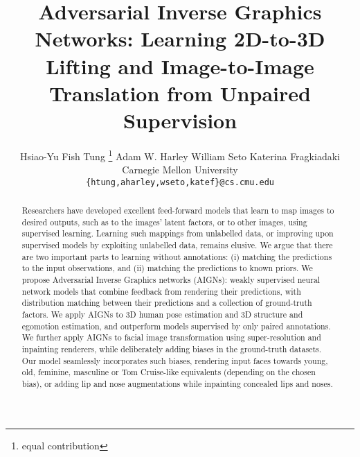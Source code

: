 \documentclass[10pt,twocolumn,letterpaper]{article}
\newcommand*\samethanks[1][\value{footnote}]{\footnotemark[#1]}
\begin{document}
\begin{bibunit}[ieee]
\title{Adversarial Inverse Graphics Networks: Learning 2D-to-3D Lifting and Image-to-Image Translation from Unpaired Supervision}

\author{Hsiao-Yu Fish Tung \thanks{equal contribution} 
\qquad
Adam W. Harley \samethanks[1] 
\qquad
William Seto \samethanks[1] 
\qquad
Katerina Fragkiadaki
\\
Carnegie Mellon University \\
{\tt\small \{htung,aharley,wseto,katef\}@cs.cmu.edu}
}

\maketitle


\begin{abstract}


Researchers have developed excellent feed-forward models that learn to map images to desired outputs, such as to the images' latent factors, or to other images, using supervised learning. Learning such mappings from unlabelled data, or improving upon supervised models by exploiting unlabelled data, remains elusive. We argue that there are two important parts to learning without annotations: 
(i) matching the predictions to the input observations, and (ii) matching the predictions to known priors.
We propose Adversarial Inverse Graphics networks (AIGNs): weakly supervised neural network models that combine feedback from rendering their predictions, with distribution matching between their predictions and a collection of ground-truth factors. We apply AIGNs to 3D human pose estimation and 3D structure and egomotion estimation, and outperform  models supervised by only paired annotations. We further apply AIGNs to facial image transformation using super-resolution and inpainting renderers, while deliberately adding biases in the ground-truth datasets. Our model seamlessly incorporates such biases, rendering input faces towards young, old, feminine, masculine or Tom Cruise-like equivalents (depending on the chosen bias), or adding lip and nose augmentations while inpainting concealed lips and noses.




\end{abstract}
\end{bibunit}
\end{document}
